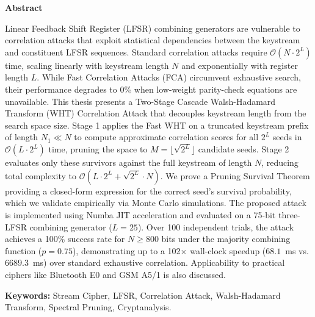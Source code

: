\newpage
{}
\begin{center}
\Large\textbf{Abstract}
\end{center}
\vspace{1em}

\begin{doublespace}
\noindent
Linear Feedback Shift Register (LFSR) combining generators are vulnerable to correlation attacks that exploit statistical dependencies between the keystream and constituent LFSR sequences. Standard correlation attacks require $\mathcal{O}(N \cdot 2^L)$ time, scaling linearly with keystream length $N$ and exponentially with register length $L$. While Fast Correlation Attacks (FCA) circumvent exhaustive search, their performance degrades to 0\% when low-weight parity-check equations are unavailable. This thesis presents a Two-Stage Cascade Walsh-Hadamard Transform (WHT) Correlation Attack that decouples keystream length from the search space size. Stage 1 applies the Fast WHT on a truncated keystream prefix of length $N_1 \ll N$ to compute approximate correlation scores for all $2^L$ seeds in $\mathcal{O}(L \cdot 2^L)$ time, pruning the space to $M = \lfloor\sqrt{2^L}\rfloor$ candidate seeds. Stage 2 evaluates only these survivors against the full keystream of length $N$, reducing total complexity to $\mathcal{O}(L \cdot 2^L + \sqrt{2^L} \cdot N)$. We prove a Pruning Survival Theorem providing a closed-form expression for the correct seed's survival probability, which we validate empirically via Monte Carlo simulations. The proposed attack is implemented using Numba JIT acceleration and evaluated on a 75-bit three-LFSR combining generator ($L=25$). Over 100 independent trials, the attack achieves a 100\% success rate for $N \ge 800$ bits under the majority combining function ($p=0.75$), demonstrating up to a 102$\times$ wall-clock speedup ($68.1$~ms vs. $6689.3$~ms) over standard exhaustive correlation. Applicability to practical ciphers like Bluetooth E0 and GSM A5/1 is also discussed.

\vspace{1.5em}
\noindent\textbf{Keywords:} Stream Cipher, LFSR, Correlation Attack, Walsh-Hadamard Transform, Spectral Pruning, Cryptanalysis.
\end{doublespace}
